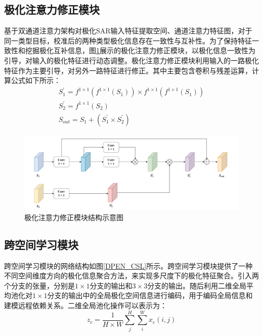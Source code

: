\subsection{极化注意力修正模块}
基于双通道注意力架构对极化SAR输入特征提取空间、通道注意力特征图，对于同一类型目标，校准后的两种类型极化信息存在一致性与互补性。为了保持特征一致性和挖掘极化互补信息，图\ref{DPEN_WFM}展示的极化注意力修正模块，以极化信息一致性为引导，对输入的极化特征进行动态调整。极化注意力修正模块利用输入的一路极化特征作为主要引导，对另外一路特征进行修正。其中主要包含卷积与残差运算，计算公式如下所示：
\begin{gather}
  S_{1}^{\prime}=f^{1\times 1}\left( f^{1\times 1}\left( S_1 \right) \right) \times f^{1\times 1}\left( f^{1\times 1}\left( S_1 \right) \right)
  \\
  S_{2}^{\prime}=f^{1\times 1}\left( S_2 \right)
  \\
  S_{out}=S_1+\left( S_{1}^{\prime}\times S_{2}^{\prime} \right)
\end{gather}

\begin{figure}[h]
  \centering
  \includegraphics[width=14cm]{pic/chapter3/极化注意力修正.pdf}
  \caption{极化注意力修正模块结构示意图}
  \label{DPEN_WFM}
\end{figure}


\subsection{跨空间学习模块}
跨空间学习模块的网络结构如图\ref{DPEN_CSL}所示。跨空间学习模块提供了一种不同空间维度方向的极化信息聚合方法，来实现多尺度下的极化特征聚合。引入两个分支的张量，分别是$1\times 1$分支的输出和$3 \times 3$分支的输出。随后利用二维全局平均池化对$1\times 1$分支的输出中的全局极化空间信息进行编码，用于编码全局信息和建模远程依赖关系。二维全局池化操作可以表示为：
\begin{equation}
  z_c=\frac{1}{H\times W}\sum_{j}^{H}\sum_{i}^{W}x_c(i,j)
\end{equation}


